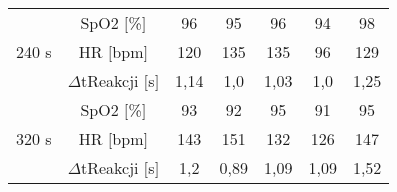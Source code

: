 \begin{table}[ht]
\begin{tabular}{|c|c|c|c|c|c|c|}
        \multirow{3}{*}{240 s} & SpO2 $[$\%$]$ & 96  &  95 &  96 & 94  & 98  \\ \cline{2-7} 
                              & HR $[$bpm$]$     & 120  & 135  & 135  & 96  &  129 \\ \cline{2-7} 
                              & $\Delta$tReakcji $[$s$]$   & 1,14  & 1,0  & 1,03  & 1,0  & 1,25  \\ \hline
        \multirow{3}{*}{320 s} & SpO2 $[$\%$]$ & 93  &  92 &  95 & 91  & 95  \\ \cline{2-7} 
                              & HR $[$bpm$]$     & 143  & 151  & 132  & 126  &  147 \\ \cline{2-7} 
                              & $\Delta$tReakcji $[$s$]$   & 1,2  & 0,89  & 1,09  & 1,09  & 1,52  \\ \hline
        \end{tabular}
    \end{table}